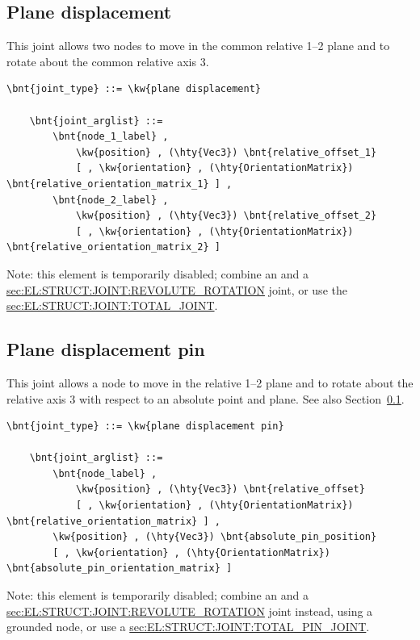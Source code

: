 \subsection{Plane displacement}\label{sec:EL:STRUCT:JOINT:PLANE_DISPLACEMENT}
This joint allows two nodes to move in the common relative 1--2 plane 
and to rotate about the common relative axis 3.
\begin{Verbatim}[commandchars=\\\{\}]
    \bnt{joint_type} ::= \kw{plane displacement}

    \bnt{joint_arglist} ::= 
        \bnt{node_1_label} ,
            \kw{position} , (\hty{Vec3}) \bnt{relative_offset_1}
            [ , \kw{orientation} , (\hty{OrientationMatrix}) \bnt{relative_orientation_matrix_1} ] ,
        \bnt{node_2_label} ,
            \kw{position} , (\hty{Vec3}) \bnt{relative_offset_2}
            [ , \kw{orientation} , (\hty{OrientationMatrix}) \bnt{relative_orientation_matrix_2} ]
\end{Verbatim}
Note: this element is temporarily disabled;
combine an  and a
\hyperref{\kw{revolute rotation}}{\kw{revolute rotation} (see Section~}{)}{sec:EL:STRUCT:JOINT:REVOLUTE_ROTATION}
joint, or use the 
\hyperref{\kw{total joint}}{\kw{total joint}, see Section~}{}{sec:EL:STRUCT:JOINT:TOTAL_JOINT}.

\subsection{Plane displacement pin}
This joint allows a node to move in the relative 1--2 plane 
and to rotate about the relative axis 3 with respect to an absolute point 
and plane.
See also Section~\ref{sec:EL:STRUCT:JOINT:PLANE_DISPLACEMENT}.
\begin{Verbatim}[commandchars=\\\{\}]
    \bnt{joint_type} ::= \kw{plane displacement pin}

    \bnt{joint_arglist} ::= 
        \bnt{node_label} ,
            \kw{position} , (\hty{Vec3}) \bnt{relative_offset}
            [ , \kw{orientation} , (\hty{OrientationMatrix}) \bnt{relative_orientation_matrix} ] ,
        \kw{position} , (\hty{Vec3}) \bnt{absolute_pin_position}
        [ , \kw{orientation} , (\hty{OrientationMatrix}) \bnt{absolute_pin_orientation_matrix} ]
\end{Verbatim}
Note: this element is temporarily disabled;
combine an  and a
\hyperref{\kw{revolute rotation}}{\kw{revolute rotation} (see Section~}{)}{sec:EL:STRUCT:JOINT:REVOLUTE_ROTATION}
joint instead, using a grounded node, or use a
\hyperref{\kw{total pin joint}}{\kw{total pin joint}, see Section~}{}{sec:EL:STRUCT:JOINT:TOTAL_PIN_JOINT}.


